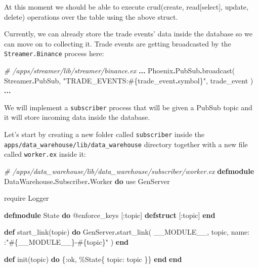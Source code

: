 \documentclass[
]{book}
\newenvironment{Shaded}{\begin{snugshade}}{\end{snugshade}}
\newcommand{\CommentTok}[1]{\textcolor[rgb]{0.56,0.35,0.01}{\textit{#1}}}
\newcommand{\ConstantTok}[1]{\textcolor[rgb]{0.00,0.00,0.00}{#1}}
\newcommand{\ImportTok}[1]{#1}
\newcommand{\KeywordTok}[1]{\textcolor[rgb]{0.13,0.29,0.53}{\textbf{#1}}}
\newcommand{\NormalTok}[1]{#1}
\newcommand{\OperatorTok}[1]{\textcolor[rgb]{0.81,0.36,0.00}{\textbf{#1}}}
\newcommand{\OtherTok}[1]{\textcolor[rgb]{0.56,0.35,0.01}{#1}}
\newcommand{\StringTok}[1]{\textcolor[rgb]{0.31,0.60,0.02}{#1}}
\newcommand{\VariableTok}[1]{\textcolor[rgb]{0.00,0.00,0.00}{#1}}
\begin{document}
At this moment we should be able to execute crud(create, read{[}select{]}, update, delete) operations over the table using the above struct.

Currently, we can already store the trade events' data inside the database so we can move on to collecting it. Trade events are getting broadcasted by the \texttt{Streamer.Binance} process here:

\begin{Shaded}
\begin{Highlighting}[]
    \CommentTok{\# /apps/streamer/lib/streamer/binance.ex}
    \OperatorTok{...}
    \ConstantTok{Phoenix}\OperatorTok{.}\ConstantTok{PubSub}\OperatorTok{.}\NormalTok{broadcast(}
      \ConstantTok{Streamer}\OperatorTok{.}\ConstantTok{PubSub}\NormalTok{,}
      \StringTok{"TRADE\_EVENTS:}\OtherTok{\#\{}\NormalTok{trade\_event}\OperatorTok{.}\NormalTok{symbol}\OtherTok{\}}\StringTok{"}\NormalTok{,}
\NormalTok{      trade\_event}
\NormalTok{    )}
    \OperatorTok{...}
\end{Highlighting}
\end{Shaded}

We will implement a \texttt{subscriber} process that will be given a PubSub topic and it will store incoming data inside the database.

Let's start by creating a new folder called \texttt{subscriber} inside the \texttt{apps/data\_warehouse/lib/data\_warehouse} directory together with a new file called \texttt{worker.ex} inside it:

\begin{Shaded}
\begin{Highlighting}[]
\CommentTok{\# /apps/data\_warehouse/lib/data\_warehouse/subscriber/worker.ex}
\KeywordTok{defmodule} \ConstantTok{DataWarehouse}\OperatorTok{.}\ConstantTok{Subscriber}\OperatorTok{.}\ConstantTok{Worker} \KeywordTok{do}
  \ImportTok{use} \ConstantTok{GenServer}

  \ImportTok{require} \ConstantTok{Logger}

  \KeywordTok{defmodule} \ConstantTok{State} \KeywordTok{do}
    \OtherTok{@enforce\_keys}\NormalTok{ [}\VariableTok{:topic}\NormalTok{]}
    \KeywordTok{defstruct}\NormalTok{ [}\VariableTok{:topic}\NormalTok{]}
  \KeywordTok{end}

  \KeywordTok{def}\NormalTok{ start\_link(topic) }\KeywordTok{do}
    \ConstantTok{GenServer}\OperatorTok{.}\NormalTok{start\_link(}
      \ConstantTok{\_\_MODULE\_\_}\NormalTok{,}
\NormalTok{      topic,}
      \VariableTok{name:}\NormalTok{ :}\StringTok{"}\OtherTok{\#\{}\ConstantTok{\_\_MODULE\_\_}\OtherTok{\}}\StringTok{{-}}\OtherTok{\#\{}\NormalTok{topic}\OtherTok{\}}\StringTok{"}
\NormalTok{    )}
  \KeywordTok{end}

  \KeywordTok{def}\NormalTok{ init(topic) }\KeywordTok{do}
\NormalTok{    \{}\VariableTok{:ok}\NormalTok{,}
\NormalTok{     \%}\ConstantTok{State}\NormalTok{\{}
       \VariableTok{topic:}\NormalTok{ topic}
\NormalTok{     \}\}}
  \KeywordTok{end}
\KeywordTok{end}
\end{Highlighting}
\end{Shaded}
\end{document}

